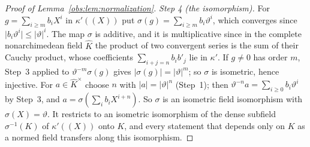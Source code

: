 \documentclass[11pt]{amsart}
\theoremstyle{definition}
\theoremstyle{remark}
\numberwithin{equation}{section}
\newcommand{\abs}[1]{\lvert #1\rvert}
\newcommand{\Kh}{\widehat K}
\theoremstyle{plain}
\theoremstyle{definition}
\theoremstyle{plain}
\begin{document}
\begin{proof}[Proof of Lemma~\ref{obs:lem:normalization}]
\emph{Step 4 (the isomorphism).} For $g=\sum_{i\ge m}b_iX^i$ in $\kappa'((X))$ put $\sigma(g)=\sum_{i\ge m}b_i\vartheta^i$,
which converges since $\abs{b_i\vartheta^i}\le\abs\vartheta^i$. The map $\sigma$ is additive, and it is multiplicative
since in the complete nonarchimedean field $\Kh$ the product of two convergent series is the sum of their Cauchy
product, whose coefficients $\sum_{i+j=n}b_ib'_j$ lie in $\kappa'$. If $g\ne0$ has order $m$, Step~3 applied to
$\vartheta^{-m}\sigma(g)$ gives $\abs{\sigma(g)}=\abs\vartheta^m$; so $\sigma$ is isometric, hence injective. For
$a\in\Kh^\times$ choose $n$ with $\abs a=\abs\vartheta^n$ (Step~1); then $\vartheta^{-n}a=\sum_{i\ge0}b_i\vartheta^i$ by
Step~3, and $a=\sigma(\sum_ib_iX^{i+n})$. So $\sigma$ is an isometric field isomorphism with $\sigma(X)=\vartheta$. It
restricts to an isometric isomorphism of the dense subfield $\sigma^{-1}(K)$ of $\kappa'((X))$ onto $K$, and every
statement that depends only on $K$ as a normed field transfers along this isomorphism.
\end{proof}
\end{document}

